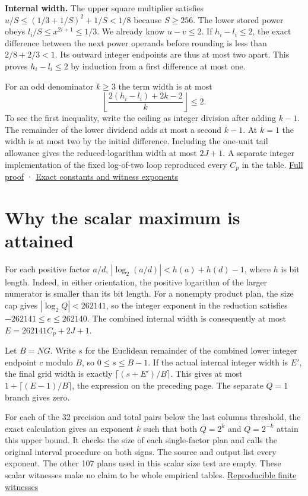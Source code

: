 \textbf{Internal width.} The upper square multiplier satisfies \(u/S\le(1/3+1/S)^2+1/S<1/8\) because \(S\ge256\). The lower stored power obeys \(l_i/S\le x^{2i+1}\le1/3\). We already know \(u-v\le2\). If \(h_i-l_i\le2\), the exact difference between the next power operands before rounding is less than \(2/8+2/3<1\). Its outward integer endpoints are thus at most two apart. This proves \(h_i-l_i\le2\) by induction from a first difference at most one.

For an odd denominator \(k\ge3\) the term width is at most \[
\left\lfloor\frac{2(h_i-l_i)+2k-2}{k}\right\rfloor\le2.
\] To see the first inequality, write the ceiling as integer division after adding \(k-1\). The remainder of the lower dividend adds at most a second \(k-1\). At \(k=1\) the width is at most two by the initial difference. Including the one-unit tail allowance gives the reduced-logarithm width at most \(2J+1\). A separate integer implementation of the fixed log-of-two loop reproduced every \(C_p\) in the table. \href{https://github.com/sepahead/pid-rs/blob/main/audit/research/signed-log-certificate-enclosure/numerical/SHARP-WIDTH.md}{Full proof} · \href{https://github.com/sepahead/pid-rs/blob/main/audit/research/signed-log-certificate-enclosure/numerical/scalar_width.json}{Exact constants and witness exponents}

\clearpage

\section{Why the scalar maximum is attained}\label{why-the-scalar-maximum-is-attained}

For each positive factor \(a/d\), \(|\log_2(a/d)|<h(a)+h(d)-1\), where \(h\) is bit length. Indeed, in either orientation, the positive logarithm of the larger numerator is smaller than its bit length. For a nonempty product plan, the size cap gives \(|\log_2 Q|<262141\), so the integer exponent in the reduction satisfies \(-262141\le e\le262140\). The combined internal width is consequently at most \(E=262141C_p+2J+1\).

Let \(B=NG\). Write \(s\) for the Euclidean remainder of the combined lower integer endpoint \(c\) modulo \(B\), so \(0\le s\le B-1\). If the actual internal integer width is \(E'\), the final grid width is exactly \(\lceil(s+E')/B\rceil\). This gives at most \(1+\lceil(E-1)/B\rceil\), the expression on the preceding page. The separate \(Q=1\) branch gives zero.

For each of the 32 precision and total pairs below the last column\textquotesingle s threshold, the exact calculation gives an exponent \(k\) such that both \(Q=2^k\) and \(Q=2^{-k}\) attain this upper bound. It checks the size of each single-factor plan and calls the original interval procedure on both signs. The source and output list every exponent. The other 107 plans used in this scalar size test are empty. These scalar witnesses make no claim to be whole empirical tables. \href{https://github.com/sepahead/pid-rs/blob/main/audit/research/signed-log-certificate-enclosure/numerical/scalar_width.py}{Reproducible finite witnesses}

